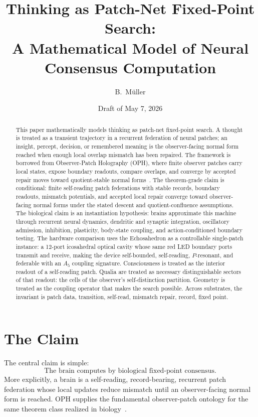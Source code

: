 \documentclass[11pt]{article}
\title{Thinking as Patch-Net Fixed-Point Search:\\
A Mathematical Model of Neural Consensus Computation}
\author{B.\ M\"uller}
\date{Draft of May 7, 2026}
\theoremstyle{remark}
\theoremstyle{plain}
\begin{document}
\maketitle

\begin{abstract}
This paper mathematically models thinking as patch-net fixed-point search. A thought is treated as a transient trajectory in a recurrent federation of neural patches; an insight, percept, decision, or remembered meaning is the observer-facing normal form reached when enough local overlap mismatch has been repaired. The framework is borrowed from Observer-Patch Holography (OPH), where finite observer patches carry local states, expose boundary readouts, compare overlaps, and converge by accepted repair moves toward quotient-stable normal forms~\cite{ObserversAreAllYouNeed,RealityAsConsensusProtocol}. The theorem-grade claim is conditional: finite self-reading patch federations with stable records, boundary readouts, mismatch potentials, and accepted local repair converge toward observer-facing normal forms under the stated descent and quotient-confluence assumptions. The biological claim is an instantiation hypothesis: brains approximate this machine through recurrent neural dynamics, dendritic and synaptic integration, oscillatory admission, inhibition, plasticity, body-state coupling, and action-conditioned boundary testing. The hardware comparison uses the Echosahedron as a controllable single-patch instance: a 12-port icosahedral optical cavity whose same red LED boundary ports transmit and receive, making the device self-bounded, self-reading, \(P\)-resonant, and federable with an \(A_5\) coupling signature. Consciousness is treated as the interior readout of a self-reading patch. Qualia are treated as necessary distinguishable sectors of that readout: the cells of the observer's self-distinction partition. Geometry is treated as the coupling operator that makes the search possible. Across substrates, the invariant is patch data, transition, self-read, mismatch repair, record, fixed point.
\end{abstract}

\tableofcontents

\section{The Claim}

The central claim is simple:
\[
\boxed{
\text{The brain computes by biological fixed-point consensus.}
}
\]
More explicitly, a brain is a self-reading, record-bearing, recurrent patch federation whose local updates reduce mismatch until an observer-facing normal form is reached. OPH supplies the fundamental observer-patch ontology for the same theorem class realized in biology~\cite{ObserversAreAllYouNeed,RealityAsConsensusProtocol}.
\end{document}
